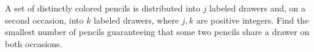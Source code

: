 A set of distinctly colored pencils is distributed into $j$ labeled drawers and, on a second occasion, into $k$ labeled drawers, where $j,k$ are positive integers. Find the smallest number of pencils guaranteeing that some two pencils share a drawer on both occasions.
